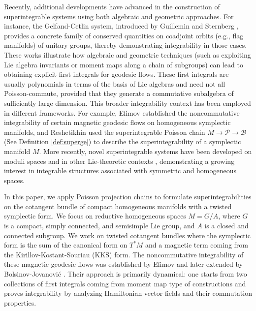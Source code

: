 \documentclass[11pt]{amsart}
\theoremstyle{definition}
\theoremstyle{plain}
\theoremstyle{conclusion}
\begin{document}
Recently, additional developments have advanced in the construction of superintegrable systems using both algebraic and geometric approaches. For instance, the Gelfand-Cetlin system, introduced by Guillemin and Sternberg \cite{GuilleminSternberg1983}, provides a concrete family of conserved quantities on coadjoint orbits (e.g., flag manifolds) of unitary groups, thereby demonstrating integrability in those cases. These works illustrate how algebraic and geometric techniques (such as exploiting Lie algebra invariants or moment maps along a chain of subgroups) can lead to obtaining explicit first integrals for geodesic flows. %
These first integrals are usually polynomials in terms of the basis of Lie algebras and need not all Poisson-commute, provided that they generate a commutative subalgebra of sufficiently large dimension. This broader integrability context has been employed in different frameworks. For example, Efimov \cite{MR2141306} established the noncommutative integrability of certain magnetic geodesic flows on homogeneous symplectic manifolds, and Reshetikhin \cite{MR3493688} used the superintegrable Poisson chain $M \to \mathcal{P} \to \mathcal{B}$ (See Definition \ref{def:superge}) to describe the superintegrability of a symplectic manifold $M$. More recently, novel superintegrable systems have been developed on moduli spaces and in other Lie-theoretic contexts \cite{MR4299124}, demonstrating a growing interest in integrable structures associated with symmetric and homogeneous spaces.

In this paper, we apply Poisson projection chains to formulate superintegrabilities on the cotangent bundle of compact homogeneous manifolds with a twisted symplectic form. We focus on reductive homogeneous spaces $M= G/A$, where $G$ is a compact, simply connected, and semisimple Lie group, and $A$ is a closed and connected subgroup. We work on twisted cotangent bundles where the symplectic form is the sum of the canonical form on $T^*M$ and a magnetic term coming from the Kirillov-Kostant-Souriau (KKS) form. The noncommutative integrability of these magnetic geodesic flows was established by Efimov \cite{MR2141306} and later extended by Bolsinov-Jovanovi{\'c} \cite{MR2410783}. Their approach is primarily dynamical: one starts from two  collections of first integrals coming from moment map type of constructions and proves integrability by analyzing Hamiltonian vector fields and their commutation properties.
\end{document}
